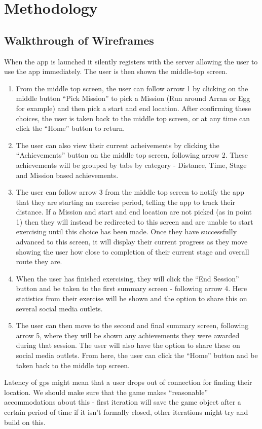 \chapter{Methodology}\label{ch_method}


\section{Walkthrough of Wireframes}
When the app is launched it silently registers with the server
allowing the user to use the app immediately. The user is then shown
the middle-top screen.
\begin{enumerate}
  \item From the middle top screen, the user can follow arrow 1 by
    clicking on the middle button ``Pick Mission'' to pick a Mission
    (Run around Arran or Egg for example) and then pick a start and
    end location. After confirming these choices, the user is taken
    back to the middle top screen, or at any time can click the
    ``Home'' button to return. 
  \item The user can also view their current acheivements by clicking
    the ``Achievements'' button on the middle top screen, following
    arrow 2. These achievements will be grouped by tabs by category -
    Distance, Time, Stage and Mission based achievements.
  \item The user can follow arrow 3 from the middle top screen to
    notify the app that they are starting an exercise period, telling
    the app to track their distance. If a Mission and start and end
    location are not picked (as in point 1) then they will instead be
    redirected to this screen and are unable to start exercising until
    this choice has been made. Once they have successfully advanced to
    this screen, it will display their current progress as they move
    showing the user how close to completion of their current stage
    and overall route they are. 
  \item When the user has finished exercising, they will click the
    ``End Session'' button and be taken to the first summary screen -
    following arrow 4. Here statistics from their exercise will be
    shown and the option to share this on several social media
    outlets.
  \item The user can then move to the second and final summary screen,
    following arrow 5, where they will be shown any achievements they
    were awarded during that session. The user will also have the
    option to share these on social media outlets. From here, the user
    can click the ``Home'' button and be taken back to the middle top
    screen. 
\end{enumerate}

Latency of gps might mean that a user drops out of connection for
finding their location. We should make sure that the game makes
``reasonable'' accommodations about this - first iteration will save
the game object after a certain period of time if it isn't formally
closed, other iterations might try and build on this.

